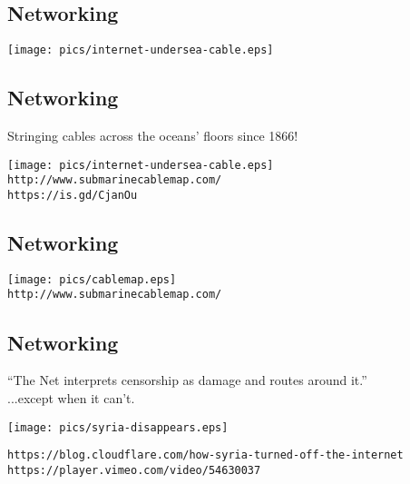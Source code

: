 \documentclass[xga]{xdvislides}
\begin{document}
\subsection{Networking}
\vspace*{\fill}
\begin{center}
	\texttt{[image: pics/internet-undersea-cable.eps]} \\
\end{center}
\vspace*{\fill}


\subsection{Networking}
Stringing cables across the oceans' floors since 1866!
\vspace*{\fill}
\begin{center}
	\texttt{[image: pics/internet-undersea-cable.eps]} \\
	\verb+http://www.submarinecablemap.com/+ \\
	\verb+https://is.gd/CjanOu+
\end{center}
\vspace*{\fill}

\subsection{Networking}
\vspace*{\fill}
\begin{center}
	\texttt{[image: pics/cablemap.eps]} \\
	\verb+http://www.submarinecablemap.com/+ \\
\end{center}
\vspace*{\fill}



\subsection{Networking}
``The Net interprets censorship as damage and routes around it.'' \\

...except when it can't.

\begin{center}
\vspace*{\fill}
	\texttt{[image: pics/syria-disappears.eps]} \\
\vspace*{\fill}

{\tt https://blog.cloudflare.com/how-syria-turned-off-the-internet} \\
{\tt https://player.vimeo.com/video/54630037}
\end{center}
\end{document}
